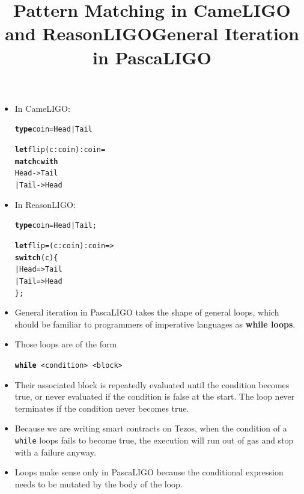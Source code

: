 \documentclass[wide]{slides}
\newcommand{\Ktype}[0]{\textbf{type}\xspace}
\newcommand{\Kwith}[0]{\textbf{with}\xspace}
\newcommand{\Klet}[0]{\textbf{let}\xspace}
\newcommand{\Kmatch}[0]{\textbf{match}\xspace}
\newcommand{\Kswitch}[0]{\textbf{switch}\xspace}
\begin{document}
\begin{slide}
  \title{Pattern Matching in CameLIGO and ReasonLIGO}

  \begin{itemize}

    \item In CameLIGO:
      \begin{alltt}
\Ktype coin = Head | Tail

\Klet flip (c : coin) : coin =
  \Kmatch c \Kwith
    Head -> Tail
  | Tail -> Head
      \end{alltt}

    \item In ReasonLIGO:
      \begin{alltt}
\Ktype coin = Head | Tail;

\Klet flip = (c : coin) : coin =>
  \Kswitch (c) \{
  | Head => Tail
  | Tail => Head
  \};
      \end{alltt}

  \end{itemize}

\end{slide}

\begin{slide}
  \title{General Iteration in PascaLIGO}

  \begin{itemize}

    \item General iteration in PascaLIGO takes the shape of general
      loops, which should be familiar to programmers of imperative
      languages as \textbf{while loops}.

    \item Those loops are of the form
      \begin{center}
        \texttt{\textbf{while} <condition> <block>}
      \end{center}

    \item Their associated block is repeatedly evaluated until the
      condition becomes true, or never evaluated if the condition is
      false at the start. The loop never terminates if the condition
      never becomes true.

    \item Because we are writing smart contracts on Tezos, when the
      condition of a \texttt{while} loops fails to become true, the
      execution will run out of gas and stop with a failure anyway.

    \item Loops make sense only in PascaLIGO because the conditional
      expression needs to be mutated by the body of the loop.

  \end{itemize}

\end{slide}
\end{document}
